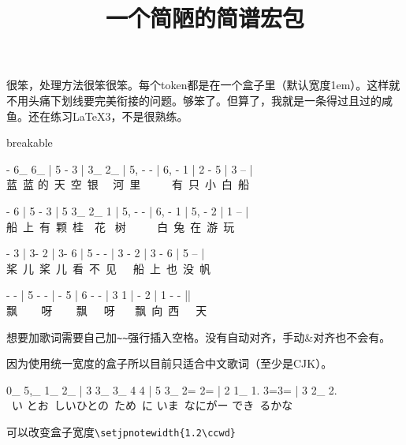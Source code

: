 \documentclass[fontset=ubuntu]{ctexart}
\title{一个简陋的简谱宏包}
\author{}
\date{}
\begin{document}
\maketitle

很笨，处理方法很笨很笨。每个token都是在一个盒子里（默认宽度1em）。这样就不用头痛下划线要完美衔接的问题。够笨了。但算了，我就是一条得过且过的咸鱼。还在练习\LaTeX3，不是很熟练。

\begin{tcblisting}{breakable}
\begin{jianpu}
 - {6_} {6_}  | 5 - 3 |  {3_} {2_}  |
{5,} - - | {6,} - 1 | 2 - 5 | 3 -- | \\
\rmfamily 蓝~蓝 的~天~空~银~~ 河~里 ~ ~ ~  有~只~小~白~船

 - 6  | 5 - 3 | 5 {3_} {2_} 1 | {5,} - - |
{6,} - 1 | {5,} - 2 | 1 -- | \\
\rmfamily 船~上~有~颗~桂~~花~ 树 ~ ~ ~ 白~兔~在~游~玩

- 3 | 3- 2 | 3- 6 | 5 - - | 3 - 2 | 3 - 6 | 5 -- |\\
\rmfamily 桨~儿~桨~儿~看~不~见~~~船~上~也~没~帆

 - - | 5 - - |  - {5} \slurE |
6 - - |  3 1 \slurE |  - 2 \slurE | 1 - - {||}\\
\rmfamily 飘 ~~~ 呀 ~~~ 飘~~~呀~~~ 飘~向~西~~~天
\end{jianpu}
\end{tcblisting}


想要加歌词需要自己加\verb|~~|强行插入空格。没有自动对齐，手动\&对齐也不会有。

因为使用统一宽度的盒子所以目前只适合中文歌词（至少是CJK）。

\begin{tcblisting}{}
\begin{jianpu}
{0_} {5,_} \; {1_} {2_} | 3 {3_} {3_} 4 4 | 5
 {3_}  {2=} {2=} |
2 {1_}  {1.} {\slurE[0pt][-.5em]} {3=}{3=}  | 3 {2_} {2.} \\
~い \; とお~しいひとの~ため~に \enspace いま~なにがー \enspace でき~るかな
\end{jianpu}
\end{tcblisting}

可以改变盒子宽度\verb|\setjpnotewidth{1.2\ccwd}|

\begin{tcblisting}{}
\setjpnotewidth{1.2\ccwd}
\end{tcblisting}
\end{document}
